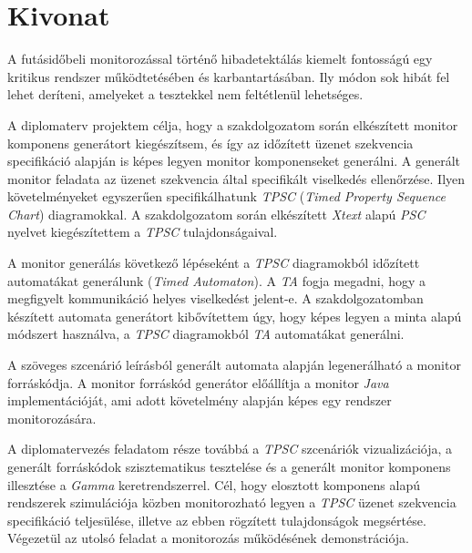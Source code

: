 \setcounter{page}{1}

\selecthungarian

\chapter*{Kivonat}

A futásidőbeli monitorozással történő hibadetektálás kiemelt fontosságú egy kritikus rendszer működtetésében és karbantartásában.
Ily módon sok hibát fel lehet deríteni, amelyeket a tesztekkel nem feltétlenül lehetséges.

A diplomaterv projektem célja, hogy a szakdolgozatom során elkészített monitor komponens generátort kiegészítsem, és így az időzített üzenet szekvencia specifikáció alapján is képes legyen monitor komponenseket generálni.
A generált monitor feladata az üzenet szekvencia által specifikált viselkedés ellenőrzése.
Ilyen követelményeket egyszerűen specifikálhatunk \textit{TPSC} (\textit{Timed Property Sequence Chart}) diagramokkal.
A szakdolgozatom során elkészített \textit{Xtext} alapú \textit{PSC} nyelvet kiegészítettem a \textit{TPSC} tulajdonságaival.

A monitor generálás következő lépéseként a \textit{TPSC} diagramokból időzített automatákat generálunk (\textit{Timed Automaton}).
A \textit{TA} fogja megadni, hogy a megfigyelt kommunikáció helyes viselkedést jelent-e.
A szakdolgozatomban készített automata generátort kibővítettem úgy, hogy képes legyen a minta alapú módszert használva, a \textit{TPSC} diagramokból \textit{TA} automatákat generálni.

A szöveges szcenárió leírásból generált automata alapján legenerálható a monitor forráskódja.
A monitor forráskód generátor előállítja a monitor \textit{Java} implementációját, ami adott követelmény alapján képes egy rendszer monitorozására.

A diplomatervezés feladatom része továbbá a \textit{TPSC} szcenáriók vizualizációja, a generált forráskódok szisztematikus tesztelése és a generált monitor komponens illesztése a \textit{Gamma} keretrendszerrel.
Cél, hogy elosztott komponens alapú rendszerek szimulációja közben monitorozható legyen a \textit{TPSC} üzenet szekvencia specifikáció teljesülése, illetve az ebben rögzített tulajdonságok megsértése.
Végezetül az utolsó feladat a monitorozás működésének demonstrációja.

